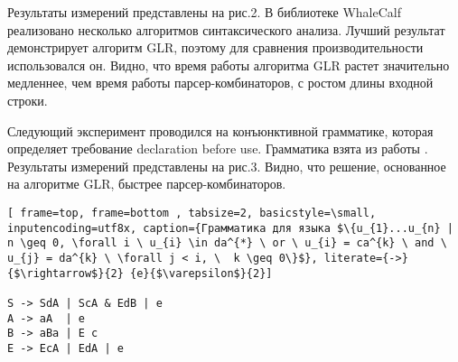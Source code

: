 Результаты измерений представлены на рис.2. В библиотеке WhaleCalf реализовано несколько алгоритмов синтаксического анализа. Лучший результат демонстрирует алгоритм GLR, поэтому для сравнения производительности использовался он. Видно, что время работы алгоритма GLR растет значительно медленнее, чем время работы парсер-комбинаторов, с ростом длины входной строки.

Следующий эксперимент проводился на конъюнктивной грамматике, которая определяет требование declaration before use. Грамматика взята из работы \cite{okhotin2013conjunctive}. Результаты измерений представлены на рис.3. Видно, что решение, основанное на алгоритме GLR, быстрее парсер-комбинаторов.

\begin{lstlisting}[ frame=top, frame=bottom , tabsize=2, basicstyle=\small, inputencoding=utf8x, caption={Грамматика для языка $\{u_{1}...u_{n} | n \geq 0, \forall i \ u_{i} \in da^{*} \ or \ u_{i} = ca^{k} \ and \ u_{j} = da^{k} \ \forall j < i, \  k \geq 0\}$}, literate={->}{$\rightarrow$}{2} {e}{$\varepsilon$}{2}]

S -> SdA | ScA & EdB | e
A -> aA  | e
B -> aBa | E c
E -> EcA | EdA | e
\end{lstlisting}

